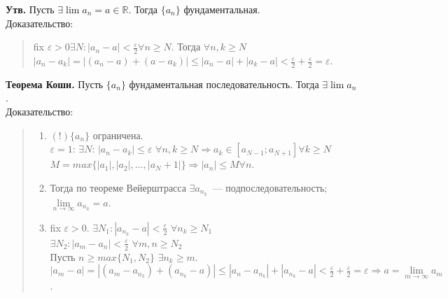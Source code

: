 \documentclass{article}
\begin{document}
	\textbf{Утв.} Пусть $\exists \lim a_n = a \in \mathbb{R}$. Тогда $\{a_n\}$ фундаментальная. \\
	Доказательство:
	\begin{quote}
		fix $\varepsilon > 0 \exists N: |a_n - a| < \frac{\varepsilon}{2} \forall n \geqslant N$. Тогда $\forall n, k \geqslant N$ $|a_n - a_k| = |(a_n - a) + (a - a_k)| \leqslant |a_n - a| + |a_k - a| < \frac{\varepsilon}{2} + \frac{\varepsilon}{2} = \varepsilon$.
	\end{quote}
	\textbf{Теорема Коши.} Пусть $\{a_n\}$ фундаментальная последовательность. Тогда $\exists \lim a_n$. \\
	Доказательство:
	\begin{quote}
		\begin{enumerate}[1)]
			\item $(!) \{a_n\}$ ограничена. \\
			$\varepsilon = 1$: $\exists N$: $|a_n - a_k| \leqslant \varepsilon$ $\forall n, k \geqslant N \Rightarrow a_k \in [a_{N - 1}; a_{N + 1}] \forall k \geqslant N$ \\
			$M = max\{|a_1|, |a_2|, \dots, |a_N + 1|\} \Rightarrow |a_n| \leqslant M \forall n$.
			\item Тогда по теореме Вейерштрасса $\exists a_{n_k}$~--- подпоследовательность; $\lim \limits_{n \rightarrow \infty} a_{n_k} = a$.
			\item fix $\varepsilon > 0$. $\exists N_1: |a_{n_k} - a| < \frac{\varepsilon}{2}$ $\forall n_k \geqslant N_1$ \\
			$\exists N_2: |a_m - a_n| < \frac{\varepsilon}{2}$ $\forall m, n \geqslant N_2$ \\
			Пусть $n \geqslant max\{N_1, N_2\}$ $\exists n_k \geqslant m$. \\
			$|a_m - a| = |(a_m - a_{n_k}) + (a_{n_k} - a)| \leqslant |a_n - a_{n_k}| + |a_{n_k} - a| < \frac{\varepsilon}{2} + \frac{\varepsilon}{2} = \varepsilon \Rightarrow a = \lim \limits_{m \rightarrow \infty} a_m$.
		\end{enumerate}
	\end{quote}
\end{document}
